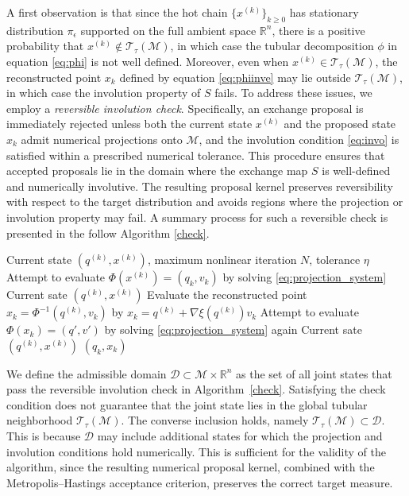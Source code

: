 \documentclass[12pt]{article}
\begin{document}
A first observation is that since the hot chain $\{x^{(k)}\}_{k\ge0}$ has
stationary distribution $\pi_\epsilon$ supported on the full ambient space
$\mathbb{R}^n$, there is a positive probability that
$x^{(k)}\notin\mathcal{T}_\tau(\mathcal{M})$, in which case the tubular decomposition $\phi$ in equation \eqref{eq:phi} is
not well defined. Moreover, even when $x^{(k)}\in\mathcal{T}_\tau(\mathcal{M})$, the
reconstructed point $x_k$ defined by equation \eqref{eq:phiinve} may lie
outside $\mathcal{T}_\tau(\mathcal{M})$, in which case the involution property of $S$
fails.
To address these issues, we employ a \emph{reversible involution check}. Specifically, an exchange proposal is immediately rejected unless both the current state $x^{(k)}$ and the proposed state $x_k$ admit numerical projections onto $\mathcal{M}$, and the involution condition \eqref{eq:invo} is satisfied within a prescribed numerical tolerance. This procedure ensures that accepted proposals lie in the domain where the exchange map $S$ is well-defined and numerically involutive. The resulting proposal kernel preserves reversibility with respect to the target distribution and avoids regions where the projection or involution property may fail. A summary process for such a reversible check is presented in the follow Algorithm \ref{check}.

\begin{algorithm}[htbp]
\caption{Reversible involution check for exchange proposal}\label{check}
\begin{algorithmic}[1]
\Require Current state $(q^{(k)},x^{(k)})$, maximum nonlinear iteration $N$, tolerance $\eta$
\State Attempt to evaluate $\Phi(x^{(k)})=(q_k,v_k)$ by solving \eqref{eq:projection_system}
    \State \Return Current sate $(q^{(k)}, x^{(k)})$
\EndIf
\State Evaluate the reconstructed point 
\(
x_k = \Phi^{-1}(q^{(k)}, v_k)
\)
by
\(
x_k = q^{(k)}+\nabla \xi(q^{(k)}) v_k
\)
\State Attempt to evaluate $\Phi(x_k) = (q',v')$ by solving \eqref{eq:projection_system} again
    \State \Return Current sate $(q^{(k)}, x^{(k)})$
\EndIf
\State \Return $(q_k,x_k)$
\end{algorithmic}
\end{algorithm}
We define the admissible domain $\mathcal{D}\subset \mathcal{M}\times \mathbb{R}^n$ as the set of all joint states that pass the reversible involution check in Algorithm~\ref{check}. Satisfying the check condition does not guarantee that the joint state lies in the global tubular neighborhood $\mathcal{T}_\tau(\mathcal{M})$. The converse inclusion holds, namely $\mathcal{T}_\tau(\mathcal{M})\subset \mathcal{D}$.
This is because $\mathcal{D}$ may include additional states for which the projection and involution conditions hold numerically. This is sufficient for the validity of the algorithm, since the resulting numerical proposal kernel, combined with the Metropolis--Hastings acceptance criterion, preserves the correct target measure.
\end{document}
